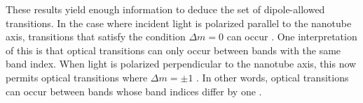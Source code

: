 These results yield enough information to deduce the set of dipole-allowed transitions. In the case where incident light is polarized parallel to the nanotube axis, transitions that satisfy the condition $\Delta m = 0$ can occur \cite{bovzovic2000optical}. One interpretation of this is that optical transitions can only occur between bands with the same band index. When light is polarized perpendicular to the nanotube axis, this now permits optical transitions where $\Delta m = \pm 1$ \cite{bovzovic2000optical}. In other words, optical transitions can occur between bands whose band indices differ by one \cite{weismanKonoBook}.





